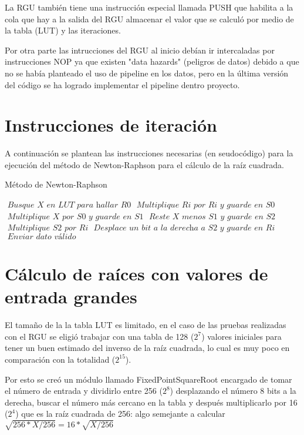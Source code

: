 La RGU también tiene una instrucción especial llamada PUSH que  habilita a la cola que hay a la salida del RGU almacenar el valor que se calculó por medio de la tabla (LUT) y las iteraciones.

Por otra parte las intrucciones del RGU al inicio debían ir intercaladas por instrucciones NOP ya que existen "data hazards" (peligros de datos) debido a que no se había planteado el uso de pipeline en los datos, pero en la última versión del código se ha logrado implementar el pipeline dentro proyecto.

\section{Instrucciones de iteración}

A continuación se plantean las instrucciones necesarias (en seudocódigo) para la ejecución del método de Newton-Raphson para el cálculo de la raíz cuadrada. 

\begin{algorithm}
\caption{Método de Newton-Raphson}\label{ray}
\begin{algorithmic}[1]
\State $\textit{ Busque X en LUT para hallar R0}$
\State $\textit{ Multiplique Ri por Ri y guarde en S0}$
\State $\textit{ Multiplique X por S0 y guarde en S1}$
\State $\textit{ Reste X menos S1 y guarde en S2}$
\State $\textit{ Multiplique S2 por Ri}$
\State $\textit{ Desplace un bit a la derecha a S2 y guarde en Ri}$
\EndFor
\State $\textit{ Enviar dato válido}$
\EndProcedure
\end{algorithmic}
\end{algorithm}

\section{Cálculo de raíces con valores de entrada grandes}


El tamaño de la la tabla LUT es limitado, en el caso de las pruebas realizadas con el RGU se eligió trabajar con una tabla de 128 ($2^7$) valores iniciales para tener un buen estimado del inverso de la raíz cuadrada, lo cual es muy poco en comparación con la totalidad ($2^{15}$).

Por esto se creó un módulo llamado FixedPointSquareRoot encargado de tomar el número de entrada y dividirlo entre 256 ($2^8$) desplazando el número 8 bits a la derecha, buscar el número más cercano en la tabla y después multiplicarlo por 16 ($2^4$) que es la raíz cuadrada de 256: algo semejante a calcular $\sqrt{256*X/256}=16*\sqrt{X/256}$ 


